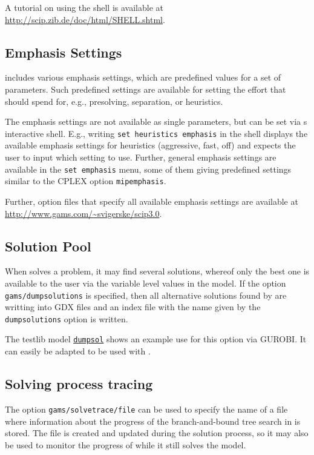 A tutorial on using the \SCIP shell is available at \url{http://scip.zib.de/doc/html/SHELL.shtml}.

\subsection{Emphasis Settings}

\SCIP includes various emphasis settings, which are predefined values for a set of \SCIP parameters.
Such predefined settings are available for setting the effort that \SCIP should spend for, e.g., presolving, separation, or heuristics.

The emphasis settings are not available as single parameters, but can be set via {\SCIP}s interactive shell.
E.g., writing \texttt{set heuristics emphasis} in the shell displays the available emphasis settings for heuristics (aggressive, fast, off) and expects the user to input which setting to use.
Further, general emphasis settings are available in the \texttt{set emphasis} menu, some of them giving predefined settings similar to the CPLEX option \texttt{mipemphasis}.

Further, option files that specify all available emphasis settings are available at \url{http://www.gams.com/~svigerske/scip3.0}.

\subsection{Solution Pool}

When \SCIP solves a problem, it may find several solutions, whereof only the best one is available to the \GAMS user via the variable level values in the \GAMS model.
If the option \texttt{gams/dumpsolutions} is specified, then all alternative solutions found by \SCIP are writting into GDX files and an index file with the name given by the \texttt{dumpsolutions} option is written.

The \GAMS testlib model \href{http://www.gams.com/testlib/libhtml/dumpsol.htm}{\texttt{dumpsol}} shows an example use for this option via GUROBI. It can easily be adapted to be used with \SCIP.

\subsection{Solving process tracing}

The option \texttt{gams/solvetrace/file} can be used to specify the name of a file where information about the progress of the branch-and-bound tree search in \SCIP is stored. The file is created and updated during the solution process, so it may also be used to monitor the progress of \SCIP while it still solves the model.

